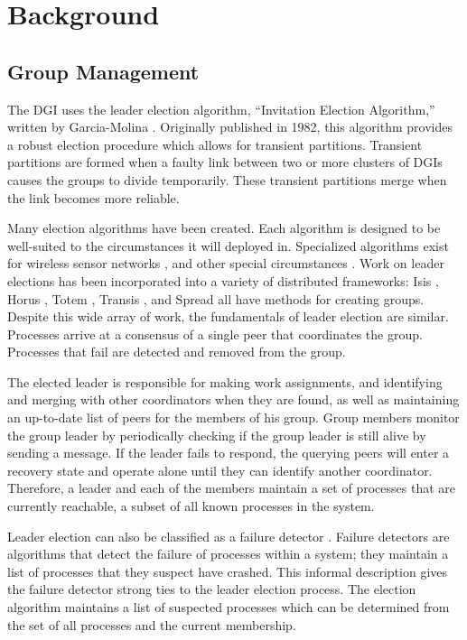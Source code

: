 \section{Background}

\subsection{Group Management}

The DGI uses the leader election algorithm, ``Invitation Election Algorithm,'' written by Garcia-Molina \cite{INVITATIONELECTION}.
Originally published in 1982, this algorithm provides a robust election procedure which allows for transient partitions.
Transient partitions are formed when a faulty link between two or more clusters of DGIs causes the groups to divide temporarily.
These transient partitions merge when the link becomes more reliable.

Many election algorithms have been created. 
Each algorithm is designed to be well-suited to the circumstances it will deployed in.
Specialized algorithms exist for wireless sensor networks \cite{LE-WSN-1}\cite{LE-WSN-2}, and other special circumstances \cite{LE-SPECIALCIRCUMSTANCES-1}\cite{LE-SPECIALCIRCUMSTANCES-2}.
Work on leader elections has been incorporated into a variety of distributed frameworks: Isis \cite{ISISTOOLKIT}, Horus \cite{HORUSTOOLKIT}, Totem \cite{TOTEMTOOLKIT}, Transis \cite{TRANSISTOOLKIT}, and Spread \cite{SPREADTOOLKIT} all have methods for creating groups.
Despite this wide array of work, the fundamentals of leader election are similar.
Processes arrive at a consensus of a single peer that coordinates the group.
Processes that fail are detected and removed from the group. 

The elected leader is responsible for making work assignments, and identifying and merging with other coordinators when they are found, as well as maintaining an up-to-date list of peers for the members of his group. 
Group members monitor the group leader by periodically checking if the group leader is still alive by sending a message. 
If the leader fails to respond, the querying peers will enter a recovery state and operate alone until they can identify another coordinator.
Therefore, a leader and each of the members maintain a set of processes that are currently reachable, a subset of all known processes in the system.

Leader election can also be classified as a failure detector \cite{LEADERELECTIONEVAL}.
Failure detectors are algorithms that detect the failure of processes within a system; they maintain a list of processes that they suspect have crashed.
This informal description gives the failure detector strong ties to the leader election process. 
The election algorithm maintains a list of suspected processes which can be determined from the set of all processes and the current membership.

